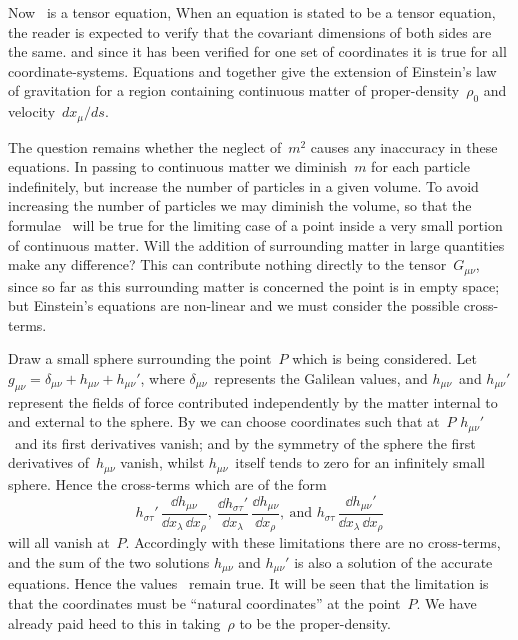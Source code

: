\documentclass[12pt]{book}
\begin{document}
Now ~is a tensor equation\footnotemark,\footnotetext
  {When an equation is stated to be a tensor equation, the reader is expected to verify that the
  covariant dimensions of both sides are the same.}
and since it has been verified for one set
of coordinates it is true for all coordinate\hyp{}systems. Equations  and 
together give the extension of Einstein's law of gravitation for a region containing
continuous matter of proper\hyp{}density~$\rho_{0}$ and velocity~$dx_{\mu}/ds$.

The question remains whether the neglect of~$m^{2}$ causes any inaccuracy in
these equations. In passing to continuous matter we diminish~$m$ for each
particle indefinitely, but increase the number of particles in a given volume.
To avoid increasing the number of particles we may diminish the volume, so
that the formulae~ will be true for the limiting case of a point inside a
very small portion of continuous matter. Will the addition of surrounding
matter in large quantities make any difference? This can contribute nothing
directly to the tensor~$G_{\mu\nu}$, since so far as this surrounding matter is concerned
the point is in empty space; but Einstein's equations are non\hyp{}linear and we
must consider the possible cross-terms.

Draw a small sphere surrounding the point~$P$ which is being considered.
Let $g_{\mu\nu} = \delta_{\mu\nu} + h_{\mu\nu} + h_{\mu\nu}'$, where $\delta_{\mu\nu}$~represents the Galilean values, and $h_{\mu\nu}$~and
$h_{\mu\nu}'$ represent the fields of force contributed independently by the matter internal
to and external to the sphere. By  we can choose coordinates such
that at~$P$ $h_{\mu\nu}'$~and its first derivatives vanish; and by the symmetry of the
sphere the first derivatives of~$h_{\mu\nu}$ vanish, whilst $h_{\mu\nu}$~itself tends to zero for an
infinitely small sphere. Hence the cross-terms which are of the form
\[
h_{\sigma\tau}'\, \frac{\dd h_{\mu\nu}}{\dd x_{\lambda}\, \dd x_{\rho}},\
\frac{\dd h_{\sigma\tau}'}{\dd x_{\lambda}}\, \frac{\dd h_{\mu\nu}}{\dd x_{\rho}},\
\text{and }
h_{\sigma\tau}\, \frac{\dd h_{\mu\nu}'}{\dd x_{\lambda}\, \dd x_{\rho}}
\]
will all vanish at~$P$. Accordingly with these limitations there are no cross-terms,
and the sum of the two solutions $h_{\mu\nu}$ and $h_{\mu\nu}'$ is also a solution of the
accurate equations. Hence the values~\Eq{(46.5)} remain true. It will be seen that
the limitation is that the coordinates must be ``natural coordinates'' at the
point~$P$. We have already paid heed to this in taking~$\rho$ to be the proper\hyp{}density.
\end{document}
